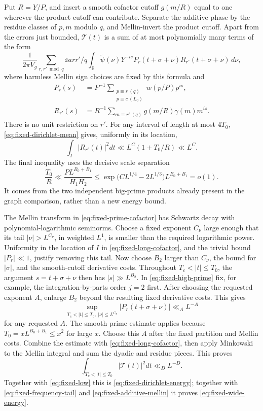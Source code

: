 Put \(R=Y/P\), and insert a smooth cofactor cutoff
\(g(m/R)\) equal to one wherever the product cutoff can contribute.
Separate the additive phase by the residue classes of \(p,m\)
modulo \(q\), and Mellin-invert the product cutoff. Apart from
the errors just bounded, \(\mathcal T(t)\) is a sum of at most
polynomially many terms of the form
\begin{equation}\label{eq:fixed-prime-cofactor}
 \frac{1}{2\pi V_g}\sum_{r,r'\bmod q}\ee{arr'/q}
       \int_{\mathbb R}\widetilde\psi(\nu)Y^{-i\nu}
          P_r(t+\sigma+\nu)R_{r'}(t+\sigma+\nu)\,d\nu,
\end{equation}
where harmless Mellin sign choices are fixed by this formula and
\[
 \begin{split}
 P_r(s)&=P^{-1}\sum_{\substack{p\equiv r\ (q)\\p\equiv c\ (L_0)}}
                    w(p/P)p^{is},\\
 R_{r'}(s)&=R^{-1}\sum_{m\equiv r'\ (q)}
                      g(m/R)\gamma(m)m^{is}.
 \end{split}
\]
There is no unit restriction on \(r'\). For any interval of
length at most \(4T_0\), \eqref{eq:fixed-dirichlet-mean} gives,
uniformly in its location,
\begin{equation}\label{eq:fixed-long-cofactor}
       \int_I|R_{r'}(t)|^2dt\ll L^C(1+T_0/R)\ll L^C.
\end{equation}
The final inequality uses the decisive scale separation
\[
 \frac{T_0}{R}\ll\frac{P L^{B_0+B_1}}{H_1H_2}
   \le\exp\bigl(CL^{1/4}-2L^{1/3}\bigr)L^{B_0+B_1}=o(1).
\]
It comes from the two independent big-prime products already
present in the graph comparison, rather than a new energy bound.

The Mellin transform in \eqref{eq:fixed-prime-cofactor} has
Schwartz decay with polynomial-logarithmic seminorms. Choose a
fixed exponent \(C_\nu\) large enough that its tail
\(|\nu|>L^{C_\nu}\), in weighted \(L^1\), is smaller than the
required logarithmic power. Uniformity in the location of \(I\)
in \eqref{eq:fixed-long-cofactor}, and the trivial bound
\(|P_r|\ll1\), justify removing this tail. Now choose \(B_2\)
larger than \(C_\nu\), the bound for \(|\sigma|\), and the
smooth-cutoff derivative costs. Throughout
\(T_c<|t|\le T_0\), the argument
\(s=t+\sigma+\nu\) then has \(|s|\gg L^{B_2}\).
In \eqref{eq:fixed-high-prime} fix, for example, the
integration-by-parts order \(j=2\) first. After choosing the
requested exponent \(A\), enlarge \(B_2\) beyond the resulting
fixed derivative costs. This gives
\[
           \sup_{T_c<|t|\le T_0,\ |\nu|\le L^{C_\nu}}
                    |P_r(t+\sigma+\nu)|\ll_A L^{-A}
\]
for any requested \(A\). The smooth prime estimate applies
because \(T_0=xL^{B_0+B_1}\le x^2\) for large \(x\).
Choose this \(A\) after the fixed partition and Mellin costs.
Combine the estimate with \eqref{eq:fixed-long-cofactor}, then apply
Minkowski to the Mellin integral and sum the dyadic and residue
pieces. This proves
\[
              \int_{T_c<|t|\le T_0}|\mathcal T(t)|^2dt\ll_D L^{-D}.
\]
Together with \eqref{eq:fixed-low} this is
\eqref{eq:fixed-dirichlet-energy}; together with
\eqref{eq:fixed-frequency-tail} and
\eqref{eq:fixed-additive-mellin} it proves
\eqref{eq:fixed-wide-energy}.

